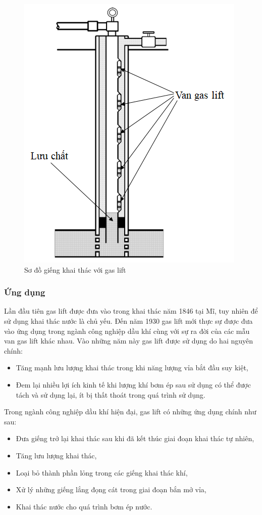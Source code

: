 \documentclass[12pt,a4paper]{report}
\begin{document}
	\begin{figure}[h]
		\centering
		\includegraphics[scale=0.7]{fig/continuous-gas-lift.png}
		\caption{Sơ đồ giếng khai thác với gas lift}
		\label{fig:continuous-gas-lift}
	\end{figure}

\subsubsection{Ứng dụng}
Lần đầu tiên gas lift được đưa vào trong khai thác năm 1846 tại Mĩ, tuy nhiên để sử dụng khai thác nước là chủ yếu. Đến năm 1930 gas lift mới thực sự được đưa vào ứng dụng trong ngành công nghiệp dầu khí cùng với sự ra đời của các mẫu van gas lift khác nhau. Vào những năm này gas lift được sử dụng do hai nguyên chính:
	\begin{itemize}
		\item Tăng mạnh lưu lượng khai thác trong khi năng lượng vỉa bắt đầu suy kiệt,
		\item Đem lại nhiều lợi ích kinh tế khi lượng khí bơm ép sau sử dụng có thể được tách và sử dụng lại, ít bị thất thoát trong quá trình sử dụng.
	\end{itemize}
Trong ngành công nghiệp dầu khí hiện đại, gas lift có những ứng dụng chính như sau:
	\begin{itemize}
		\item Đưa giếng trở lại khai thác sau khi đã kết thúc giai đoạn khai thác tự nhiên,
		\item Tăng lưu lượng khai thác,
		\item Loại bỏ thành phần lỏng trong các giếng khai thác khí,
		\item Xử lý những giếng lắng đọng cát trong giai đoạn bắn mở vỉa,
		\item Khai thác nước cho quá trình bơm ép nước.\\
	\end{itemize}
\end{document}
